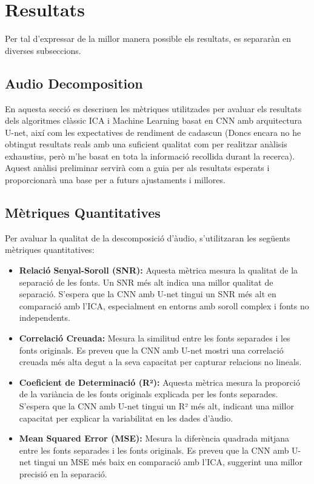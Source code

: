 \documentclass[10pt,a4paper,twocolumn,twoside]{article}
\begin{document}
\section{Resultats}
Per tal d'expressar de la millor manera possible els resultats, es separaràn en diverses subseccions.

\subsection{Audio Decomposition}

En aquesta secció es descriuen les mètriques utilitzades per avaluar els resultats dels algoritmes clàssic ICA i Machine Learning basat en CNN amb arquitectura U-net, així com les expectatives de rendiment de cadascun (Doncs encara no he obtingut resultats reals amb una suficient qualitat com per realitzar anàlisis exhaustius, però m'he basat en tota la informació recollida durant la recerca). Aquest anàlisi preliminar servirà com a guia per als resultats esperats i proporcionarà una base per a futurs ajustaments i millores.

\subsection{Mètriques Quantitatives}

Per avaluar la qualitat de la descomposició d'àudio, s'utilitzaran les següents mètriques quantitatives:

\begin{itemize}
    \item \textbf{Relació Senyal-Soroll (SNR):} \cite{Johnson:2006_SNR} Aquesta mètrica mesura la qualitat de la separació de les fonts. Un SNR més alt indica una millor qualitat de separació. S'espera que la CNN amb U-net tingui un SNR més alt en comparació amb l'ICA, especialment en entorns amb soroll complex i fonts no independents.
    
    \item \textbf{Correlació Creuada:} Mesura la similitud entre les fonts separades i les fonts originals. Es preveu que la CNN amb U-net mostri una correlació creuada més alta degut a la seva capacitat per capturar relacions no lineals.
    
    \item \textbf{Coeficient de Determinació (R²):} \cite{akossou2013impact_r_squared} Aquesta mètrica mesura la proporció de la variància de les fonts originals explicada per les fonts separades. S'espera que la CNN amb U-net tingui un R² més alt, indicant una millor capacitat per explicar la variabilitat en les dades d'àudio.
    
    \item \textbf{Mean Squared Error (MSE):} \cite{5937917_MSE} Mesura la diferència quadrada mitjana entre les fonts separades i les fonts originals. Es preveu que la CNN amb U-net tingui un MSE més baix en comparació amb l'ICA, suggerint una millor precisió en la separació.
\end{itemize}
\end{document}
